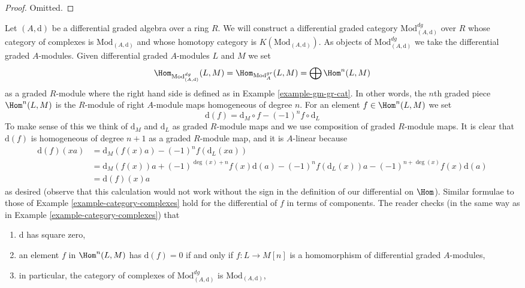 \begin{proof}
Omitted.
\end{proof}

\begin{example}
\label{example-dgm-dg-cat}
Let $(A, \text{d})$ be a differential graded algebra over a ring $R$. We will
construct a differential graded category $\text{Mod}^{dg}_{(A, \text{d})}$
over $R$ whose category of complexes is $\text{Mod}_{(A, \text{d})}$ and
whose homotopy category is $K(\text{Mod}_{(A, \text{d})})$.
As objects of $\text{Mod}^{dg}_{(A, \text{d})}$
we take the differential graded $A$-modules. Given differential
graded $A$-modules $L$ and $M$ we set
$$
\Hom_{\text{Mod}^{dg}_{(A, \text{d})}}(L, M) =
\Hom_{\text{Mod}^{gr}_A}(L, M) = \bigoplus \Hom^n(L, M)
$$
as a graded $R$-module where the right hand side is defined as in
Example \ref{example-gm-gr-cat}. In other words, the $n$th graded piece
$\Hom^n(L, M)$ is the $R$-module of right $A$-module maps homogeneous
of degree $n$. For an element $f \in \Hom^n(L, M)$ we set
$$
\text{d}(f) = \text{d}_M \circ f - (-1)^n f \circ \text{d}_L
$$
To make sense of this we think of $\text{d}_M$ and $\text{d}_L$
as graded $R$-module maps and we use composition of graded
$R$-module maps. It is clear that $\text{d}(f)$ is homogeneous of
degree $n + 1$ as a graded $R$-module map, and it is $A$-linear
because
\begin{align*}
\text{d}(f)(xa)
& =
\text{d}_M(f(x) a) - (-1)^n f (\text{d}_L(xa)) \\
& =
\text{d}_M(f(x)) a + (-1)^{\deg(x) + n} f(x) \text{d}(a) 
- (-1)^n f(\text{d}_L(x)) a - (-1)^{n + \deg(x)} f(x) \text{d}(a) \\
& = \text{d}(f)(x) a
\end{align*}
as desired (observe that this calculation would not work without the
sign in the definition of our differential on $\Hom$). Similar formulae
to those of Example \ref{example-category-complexes} hold for the
differential of $f$ in terms of components.
The reader checks (in the same way as in
Example \ref{example-category-complexes}) that
\begin{enumerate}
\item $\text{d}$ has square zero,
\item an element $f$ in $\Hom^n(L, M)$ has $\text{d}(f) = 0$ if and only if
$f : L \to M[n]$ is a homomorphism of differential graded $A$-modules,
\item in particular, the category of complexes of
$\text{Mod}^{dg}_{(A, \text{d})}$ is $\text{Mod}_{(A, \text{d})}$,

\end{enumerate}
\end{example}
